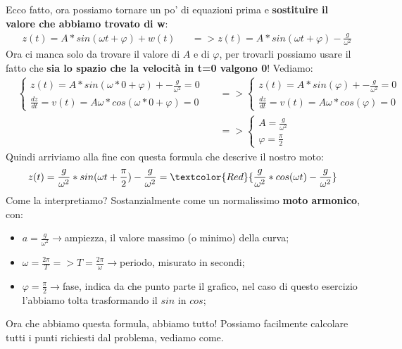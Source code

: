             Ecco fatto, ora possiamo tornare un po' di equazioni prima e \textbf{sostituire il valore che abbiamo trovato di w}:
            \begin{align*}
                &z(t) = A*sin(\omega t+\varphi)+w(t)&&=> z(t) = A*sin(\omega t+\varphi)-\frac{g}{\omega^2}
            \end{align*}
            Ora ci manca solo da trovare il valore di $A$ e di $\varphi$, per trovarli possiamo usare il fatto che \textbf{sia lo spazio che la velocità in t=0 valgono 0}! Vediamo:
            \begin{align*}
                &
                \begin{cases}
                    z(t) = A*sin(\omega*0+\varphi)+-\frac{g}{\omega^2} = 0\\
                    \frac{dz}{dt} = v(t)=A\omega*cos(\omega*0+\varphi) = 0
                \end{cases}
                &&=>
                \begin{cases}
                    z(t) = A*sin(\varphi)+-\frac{g}{\omega^2} = 0\\
                    \frac{dz}{dt} = v(t)=A\omega*cos(\varphi) = 0
                \end{cases}\\
                & &&=>
                \begin{cases}
                    A = \frac{g}{\omega^2}\\
                    \varphi=\frac{\pi}{2}
                \end{cases}
            \end{align*}
            Quindi arriviamo alla fine con questa formula che descrive il nostro moto:
            \begin{align*}
                z(t)=\frac{g}{\omega^2}*sin(\omega t + \frac{\pi}{2})-\frac{g}{\omega^2} = \textcolor{Red}{\frac{g}{\omega^2}*cos(\omega t)-\frac{g}{\omega^2}}
            \end{align*}
            Come la interpretiamo? Sostanzialmente come un normalissimo \textbf{moto armonico}, con:
            \begin{itemize}
                \item $a = \frac{g}{\omega^2}\rightarrow$ampiezza, il valore massimo (o minimo) della curva;
                \item $\omega =\frac{2\pi}{T}=>T=\frac{2\pi}{\omega}\rightarrow$periodo, misurato in secondi;
                \item $\varphi = \frac{\pi}{2}\rightarrow$fase, indica da che punto parte il grafico, nel caso di questo esercizio l'abbiamo tolta trasformando il $sin$ in $cos$;
            \end{itemize}
            Ora che abbiamo questa formula, abbiamo tutto! Possiamo facilmente calcolare tutti i punti richiesti dal problema, vediamo come.

